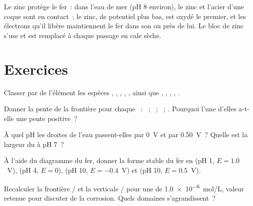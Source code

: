 Le zinc protège le fer~: dans l'eau de mer (pH 8 environ), le zinc et
l'acier d'une coque sont en contact~; le zinc, de potentiel plus bas,
est oxydé le premier, et les électrons qu'il libère maintiennent le fer
dans son  ou près de lui. Le bloc de zinc s'use et
est remplacé à chaque passage en cale sèche.

\section{Exercices}

\begin{exercise}[$\star$]\label{exo:b1:e-ph-diagrams:1}
Classer par  de l'élément les espèces ,
, , , , ainsi que ,
, ,
, .
\end{exercise}

\begin{exercise}[$\star$]\label{exo:b1:e-ph-diagrams:2}
Donner la pente de la frontière pour chaque ~:
~; ~;
~; .
Pourquoi l'une d'elles a-t-elle une pente positive~?
\end{exercise}

\begin{exercise}[$\star$]\label{exo:b1:e-ph-diagrams:3}
À quel pH les droites de l'eau passent-elles par 0~V et par
\qty{0.50}{V}~? Quelle est la largeur du  à
pH 7~?
\end{exercise}

\begin{exercise}[$\star$]\label{exo:b1:e-ph-diagrams:4}
À l'aide du diagramme du fer, donner la forme stable du fer en
(pH 1, $E = 1.0$~V), (pH 4, $E = 0$), (pH 10, $E = -0.4$~V) et
(pH 10, $E = 0.5$~V).
\end{exercise}

\begin{exercise}[$\star\star$]\label{exo:b1:e-ph-diagrams:5}
Recalculer la frontière / et la verticale
/ pour une  de
\qty{1.0e-6}{mol/L}, valeur retenue pour discuter de la corrosion. Quels
domaines s'agrandissent~?
\end{exercise}

